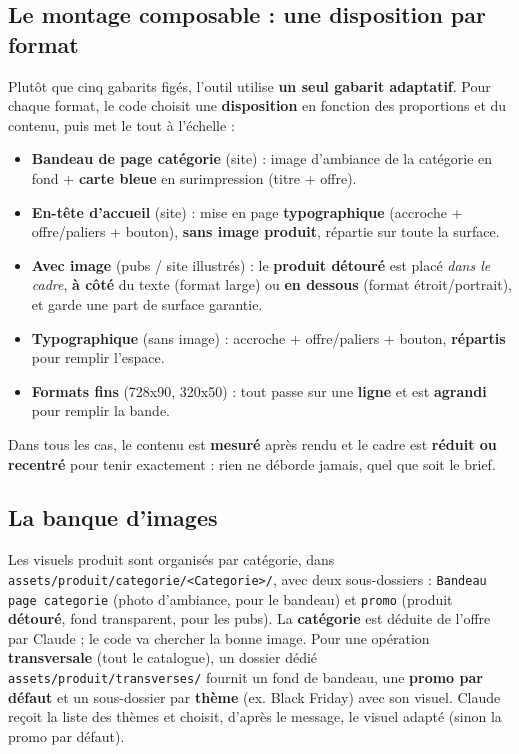 \documentclass[11pt,a4paper]{article}
\begin{document}
\subsection{Le montage composable : une disposition par format}
Plutôt que cinq gabarits figés, l'outil utilise \textbf{un seul gabarit adaptatif}.
Pour chaque format, le code choisit une \textbf{disposition} en fonction des
proportions et du contenu, puis met le tout à l'échelle :
\begin{itemize}[leftmargin=1.4em]
  \item \textbf{Bandeau de page catégorie} (site) : image d'ambiance de la
        catégorie en fond + \textbf{carte bleue} en surimpression (titre + offre).
  \item \textbf{En-tête d'accueil} (site) : mise en page \textbf{typographique}
        (accroche + offre/paliers + bouton), \textbf{sans image produit}, répartie
        sur toute la surface.
  \item \textbf{Avec image} (pubs / site illustrés) : le \textbf{produit détouré} est
        placé \emph{dans le cadre}, \textbf{à côté} du texte (format large) ou
        \textbf{en dessous} (format étroit/portrait), et garde une part de surface
        garantie.
  \item \textbf{Typographique} (sans image) : accroche + offre/paliers + bouton,
        \textbf{répartis} pour remplir l'espace.
  \item \textbf{Formats fins} (728x90, 320x50) : tout passe sur une \textbf{ligne}
        et est \textbf{agrandi} pour remplir la bande.
\end{itemize}
Dans tous les cas, le contenu est \textbf{mesuré} après rendu et le cadre est
\textbf{réduit ou recentré} pour tenir exactement : rien ne déborde jamais, quel que
soit le brief.

\subsection{La banque d'images}
Les visuels produit sont organisés par catégorie, dans
\texttt{assets/produit/categorie/<Categorie>/}, avec deux sous-dossiers :
\texttt{Bandeau page categorie} (photo d'ambiance, pour le bandeau) et
\texttt{promo} (produit \textbf{détouré}, fond transparent, pour les pubs). La
\textbf{catégorie} est déduite de l'offre par Claude ; le code va chercher la bonne
image. Pour une opération \textbf{transversale} (tout le catalogue), un dossier dédié
\texttt{assets/produit/transverses/} fournit un fond de bandeau, une \textbf{promo
par défaut} et un sous-dossier par \textbf{thème} (ex. Black Friday) avec son visuel.
Claude reçoit la liste des thèmes et choisit, d'après le message, le visuel adapté
(sinon la promo par défaut).
\end{document}
